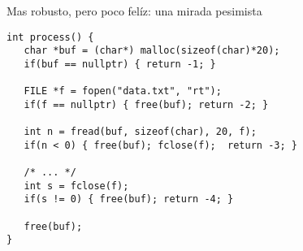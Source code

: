\begin{frame}[fragile]{Mas robusto, pero poco fel\'iz: una mirada pesimista}
   \begin{lstlisting}[style=normal]
int process() {
   char *buf = (char*) malloc(sizeof(char)*20);
   if(buf == nullptr) { return -1; }

   FILE *f = fopen("data.txt", "rt");
   if(f == nullptr) { free(buf); return -2; }

   int n = fread(buf, sizeof(char), 20, f);
   if(n < 0) { free(buf); fclose(f);  return -3; }

   /* ... */
   int s = fclose(f);
   if(s != 0) { free(buf); return -4; }

   free(buf);
}
   \end{lstlisting}
\end{frame}

